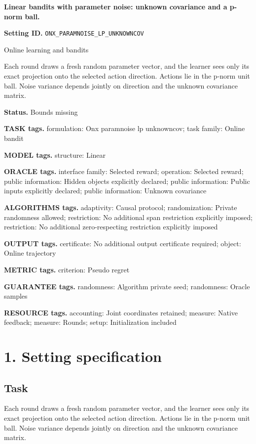 \documentclass[10pt,a4paper]{article}
\begin{document}
\raggedright

{\LARGE\bfseries\sffamily\color{AtlasNavy} Linear bandits with parameter noise: unknown covariance and a p-norm ball.\par}\vspace{5pt}
\textbf{Setting ID.} \texttt{ONX\_\allowbreak{}PARAMNOISE\_\allowbreak{}LP\_\allowbreak{}UNKNOWNCOV}

Online learning and bandits

Each round draws a fresh random parameter vector, and the learner sees only its exact projection onto the selected action direction. Actions lie in the p-norm unit ball. Noise variance depends jointly on direction and the unknown covariance matrix.

\textbf{Status.} Bounds missing

\textbf{TASK tags.} formulation: Onx paramnoise lp unknowncov; task family: Online bandit

\textbf{MODEL tags.} structure: Linear

\textbf{ORACLE tags.} interface family: Selected reward; operation: Selected reward; public information: Hidden objects explicitly declared; public information: Public inputs explicitly declared; public information: Unknown covariance

\textbf{ALGORITHMS tags.} adaptivity: Causal protocol; randomization: Private randomness allowed; restriction: No additional span restriction explicitly imposed; restriction: No additional zero-respecting restriction explicitly imposed

\textbf{OUTPUT tags.} certificate: No additional output certificate required; object: Online trajectory

\textbf{METRIC tags.} criterion: Pseudo regret

\textbf{GUARANTEE tags.} randomness: Algorithm private seed; randomness: Oracle samples

\textbf{RESOURCE tags.} accounting: Joint coordinates retained; measure: Native feedback; measure: Rounds; setup: Initialization included

\section{1. Setting specification}
\subsection{Task}
Each round draws a fresh random parameter vector, and the learner sees only its exact projection onto the selected action direction. Actions lie in the p-norm unit ball. Noise variance depends jointly on direction and the unknown covariance matrix.
\end{document}
